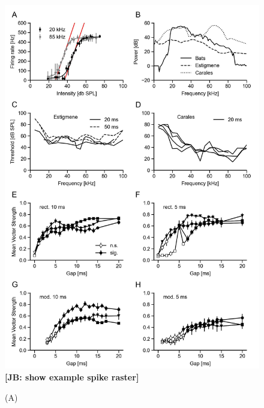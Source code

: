 \documentclass[12pt,a4paper]{article}
\newcommand{\note}[2][]{\textbf{[#1: #2]}}
\newcommand{\notejb}[1]{\note[JB]{#1}}
\begin{document}
\begin{figure}[h!]
	\centering
	\includegraphics{figures/Fig_02.jpeg}
        \notejb{show example spike raster}
	\caption{\label{fig:02}(A)}
\end{figure}
\end{document}
